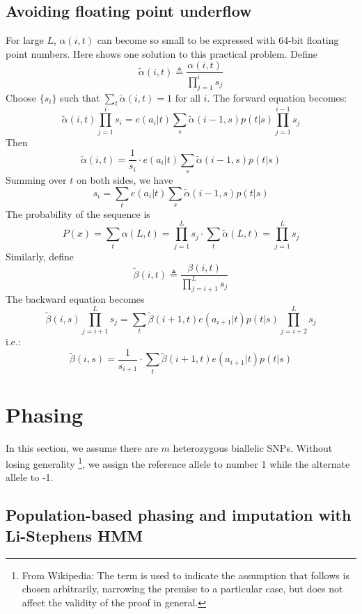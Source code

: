 \documentclass[10pt]{article}
\begin{document}
\subsection{Avoiding floating point underflow}

For large $L$, $\alpha(i,t)$ can become so small to be expressed with 64-bit
floating point numbers. Here shows one solution to this practical problem.
Define
$$
\tilde{\alpha}(i,t)\triangleq\frac{\alpha(i,t)}{\prod_{j=1}^is_j}
$$
Choose $\{s_i\}$ such that $\sum_t\tilde{\alpha}(i,t)=1$ for all $i$. The
forward equation becomes:
$$
\tilde{\alpha}(i,t)\prod_{j=1}^is_i=e(a_i|t)\sum_s\tilde{\alpha}(i-1,s)p(t|s)\prod_{j=1}^{i-1}s_j
$$
Then
$$
\tilde{\alpha}(i,t)=\frac{1}{s_i}\cdot e(a_i|t)\sum_s\tilde{\alpha}(i-1,s)p(t|s)
$$
Summing over $t$ on both sides, we have
$$
s_i=\sum_te(a_i|t)\sum_s\tilde{\alpha}(i-1,s)p(t|s)
$$
The probability of the sequence is
$$
P(x)=\sum_t\alpha(L,t)=\prod_{j=1}^Ls_j\cdot\sum_t\tilde{\alpha}(L,t)=\prod_{j=1}^Ls_j
$$
Similarly, define
$$
\tilde{\beta}(i,t)\triangleq\frac{\beta(i,t)}{\prod_{j=i+1}^Ls_j}
$$
The backward equation becomes
$$
\tilde{\beta}(i,s)\prod_{j=i+1}^Ls_j=\sum_t\tilde{\beta}(i+1,t)e(a_{i+1}|t)p(t|s)\prod_{j=i+2}^Ls_j
$$
i.e.:
$$
\tilde{\beta}(i,s)=\frac{1}{s_{i+1}}\cdot\sum_t\tilde{\beta}(i+1,t)e(a_{i+1}|t)p(t|s)
$$

\newpage

\section{Phasing}

In this section, we assume there are $m$ heterozygous biallelic SNPs. Without
losing generality
\footnote{From Wikipedia: The term is used to indicate the
assumption that follows is chosen arbitrarily, narrowing the premise to a
particular case, but does not affect the validity of the proof in general.},
we assign the reference allele to number 1 while the alternate allele to -1.

\subsection{Population-based phasing and imputation with Li-Stephens HMM}
\end{document}
